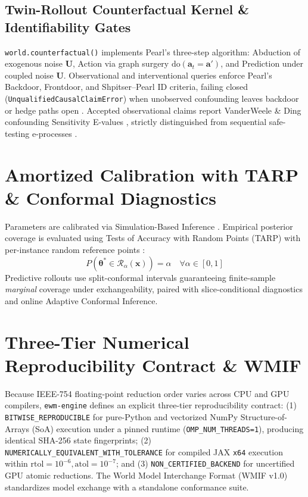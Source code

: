 \documentclass[11pt,a4paper]{article}
\begin{document}
\subsection{Twin-Rollout Counterfactual Kernel \& Identifiability Gates}
\texttt{world.counterfactual()} implements Pearl's three-step algorithm: Abduction of exogenous noise $\mathbf{U}$, Action via graph surgery $\text{do}(\mathbf{a}_t = \mathbf{a}')$, and Prediction under coupled noise $\mathbf{U}$. Observational and interventional queries enforce Pearl's Backdoor, Frontdoor, and Shpitser--Pearl ID criteria, failing closed (\texttt{UnqualifiedCausalClaimError}) when unobserved confounding leaves backdoor or hedge paths open \cite{damour2021overlap}. Accepted observational claims report VanderWeele \& Ding confounding Sensitivity E-values \cite{vanderweele2017evalues}, strictly distinguished from sequential safe-testing e-processes \cite{grunwald2024evalues}.

\section{Amortized Calibration with TARP \& Conformal Diagnostics}
Parameters are calibrated via Simulation-Based Inference \cite{papamakarios2019sequential}. Empirical posterior coverage is evaluated using Tests of Accuracy with Random Points (TARP) with per-instance random reference points \cite{lemos2023tarp}:
\begin{equation}
P(\boldsymbol{\theta}^* \in \mathcal{R}_\alpha(\mathbf{x})) = \alpha \quad \forall \alpha \in [0, 1]
\end{equation}
Predictive rollouts use split-conformal intervals guaranteeing finite-sample \emph{marginal} coverage under exchangeability, paired with slice-conditional diagnostics and online Adaptive Conformal Inference.

\section{Three-Tier Numerical Reproducibility Contract \& WMIF}
Because IEEE-754 floating-point reduction order varies across CPU and GPU compilers, \texttt{ewm-engine} defines an explicit three-tier reproducibility contract: (1) \texttt{BITWISE\_REPRODUCIBLE} for pure-Python and vectorized NumPy Structure-of-Arrays (SoA) execution under a pinned runtime (\texttt{OMP\_NUM\_THREADS=1}), producing identical SHA-256 state fingerprints; (2) \texttt{NUMERICALLY\_EQUIVALENT\_WITH\_TOLERANCE} for compiled JAX \texttt{x64} execution within $\text{rtol}=10^{-6}, \text{atol}=10^{-7}$; and (3) \texttt{NON\_CERTIFIED\_BACKEND} for uncertified GPU atomic reductions. The World Model Interchange Format (WMIF v1.0) standardizes model exchange with a standalone conformance suite.
\end{document}
